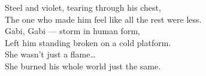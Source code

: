 \begin{lyrics}
Steel and violet, tearing through his chest,\\
The one who made him feel like all the rest were less.\\
Gabi, Gabi — storm in human form,\\
Left him standing broken on a cold platform.\\
She wasn’t just a flame…\\
She burned his whole world just the same.
\end{lyrics}

